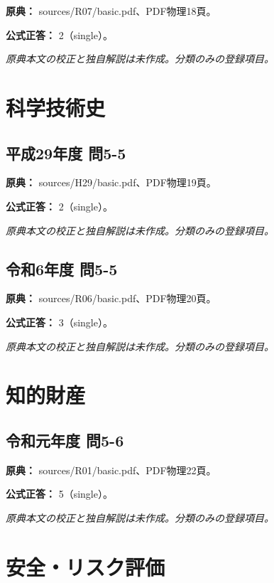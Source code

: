 \noindent\textbf{原典：} sources/R07/basic.pdf、PDF物理18頁。

\textbf{公式正答：} 2（single）。

\par\textit{原典本文の校正と独自解説は未作成。分類のみの登録項目。}

\section{科学技術史}

\subsection{平成29年度 問5-5}
\label{q:h29-reg-basic-5-5}

\noindent\textbf{原典：} sources/H29/basic.pdf、PDF物理19頁。

\textbf{公式正答：} 2（single）。

\par\textit{原典本文の校正と独自解説は未作成。分類のみの登録項目。}

\subsection{令和6年度 問5-5}
\label{q:r06-reg-basic-5-5}

\noindent\textbf{原典：} sources/R06/basic.pdf、PDF物理20頁。

\textbf{公式正答：} 3（single）。

\par\textit{原典本文の校正と独自解説は未作成。分類のみの登録項目。}

\section{知的財産}

\subsection{令和元年度 問5-6}
\label{q:r01-reg-basic-5-6}

\noindent\textbf{原典：} sources/R01/basic.pdf、PDF物理22頁。

\textbf{公式正答：} 5（single）。

\par\textit{原典本文の校正と独自解説は未作成。分類のみの登録項目。}

\section{安全・リスク評価}

